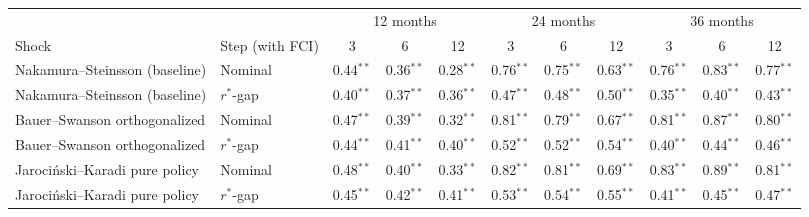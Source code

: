 \begin{tabular}{llccccccccc}
\toprule
 & & \multicolumn{3}{c}{12 months} & \multicolumn{3}{c}{24 months} & \multicolumn{3}{c}{36 months}\\
\cmidrule(lr){3-5}\cmidrule(lr){6-8}\cmidrule(lr){9-11}
Shock & Step (with FCI) & 3 & 6 & 12 & 3 & 6 & 12 & 3 & 6 & 12 \\
\midrule
Nakamura--Steinsson (baseline) & Nominal & 0.44$^{**}$ & 0.36$^{**}$ & 0.28$^{**}$ & 0.76$^{**}$ & 0.75$^{**}$ & 0.63$^{**}$ & 0.76$^{**}$ & 0.83$^{**}$ & 0.77$^{**}$ \\
Nakamura--Steinsson (baseline) & $r^*$-gap & 0.40$^{**}$ & 0.37$^{**}$ & 0.36$^{**}$ & 0.47$^{**}$ & 0.48$^{**}$ & 0.50$^{**}$ & 0.35$^{**}$ & 0.40$^{**}$ & 0.43$^{**}$ \\
\midrule
Bauer--Swanson orthogonalized & Nominal & 0.47$^{**}$ & 0.39$^{**}$ & 0.32$^{**}$ & 0.81$^{**}$ & 0.79$^{**}$ & 0.67$^{**}$ & 0.81$^{**}$ & 0.87$^{**}$ & 0.80$^{**}$ \\
Bauer--Swanson orthogonalized & $r^*$-gap & 0.44$^{**}$ & 0.41$^{**}$ & 0.40$^{**}$ & 0.52$^{**}$ & 0.52$^{**}$ & 0.54$^{**}$ & 0.40$^{**}$ & 0.44$^{**}$ & 0.46$^{**}$ \\
\midrule
Jaroci\'nski--Karadi pure policy & Nominal & 0.48$^{**}$ & 0.40$^{**}$ & 0.33$^{**}$ & 0.82$^{**}$ & 0.81$^{**}$ & 0.69$^{**}$ & 0.83$^{**}$ & 0.89$^{**}$ & 0.81$^{**}$ \\
Jaroci\'nski--Karadi pure policy & $r^*$-gap & 0.45$^{**}$ & 0.42$^{**}$ & 0.41$^{**}$ & 0.53$^{**}$ & 0.54$^{**}$ & 0.55$^{**}$ & 0.41$^{**}$ & 0.45$^{**}$ & 0.47$^{**}$ \\
\bottomrule
\end{tabular}
